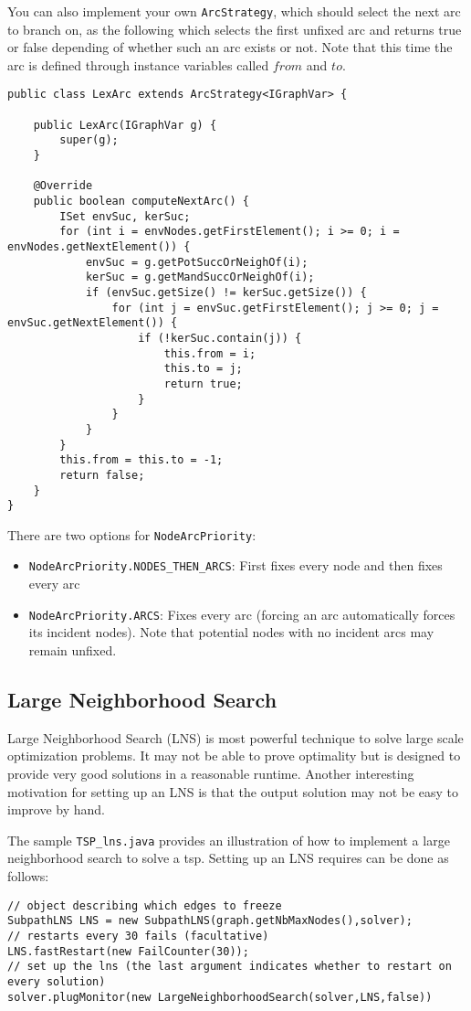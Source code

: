 \documentclass{article}
\begin{document}
You can also implement your own \texttt{ArcStrategy}, which should select the next arc to branch on, as the following which selects the first unfixed arc and returns true or false depending of whether such an arc exists or not. 
Note that this time the arc is defined through instance variables called $from$ and $to$. 
\begin{lstlisting}
public class LexArc extends ArcStrategy<IGraphVar> {

	public LexArc(IGraphVar g) {
		super(g);
	}

	@Override
	public boolean computeNextArc() {
		ISet envSuc, kerSuc;
		for (int i = envNodes.getFirstElement(); i >= 0; i = envNodes.getNextElement()) {
			envSuc = g.getPotSuccOrNeighOf(i);
			kerSuc = g.getMandSuccOrNeighOf(i);
			if (envSuc.getSize() != kerSuc.getSize()) {
				for (int j = envSuc.getFirstElement(); j >= 0; j = envSuc.getNextElement()) {
					if (!kerSuc.contain(j)) {
						this.from = i;
						this.to = j;
						return true;
					}
				}
			}
		}
		this.from = this.to = -1;
		return false;
	}
}
\end{lstlisting}

There are two options for \texttt{NodeArcPriority}:
\begin{itemize}
\item \texttt{NodeArcPriority.NODES\_THEN\_ARCS}: First fixes every node and then fixes every arc
\item \texttt{NodeArcPriority.ARCS}: Fixes every arc (forcing an arc automatically forces its incident nodes). Note that potential nodes with no incident arcs may remain unfixed. 
\end{itemize}

\subsection{Large Neighborhood Search}

Large Neighborhood Search (LNS) is most powerful technique to solve large scale optimization problems. It may not be able to prove optimality but is designed to provide very good solutions in a reasonable runtime. Another interesting motivation for setting up an LNS is that the output solution may not be easy to improve by hand. 

The sample \texttt{TSP\_lns.java} provides an illustration of how to implement a large neighborhood search to solve a tsp. 
Setting up an LNS requires can be done as follows:
\begin{lstlisting}
// object describing which edges to freeze
SubpathLNS LNS = new SubpathLNS(graph.getNbMaxNodes(),solver);
// restarts every 30 fails (facultative)
LNS.fastRestart(new FailCounter(30)); 
// set up the lns (the last argument indicates whether to restart on every solution) 
solver.plugMonitor(new LargeNeighborhoodSearch(solver,LNS,false))
\end{lstlisting} 
\end{document}
